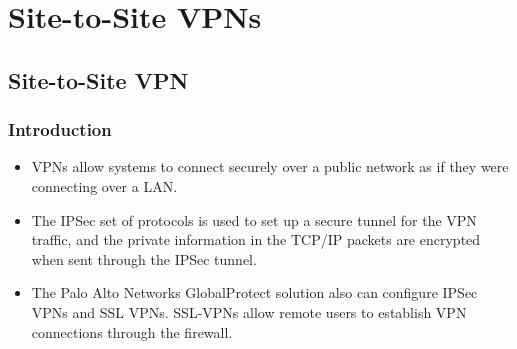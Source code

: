 \section{Site-to-Site VPNs}
\subsection{Site-to-Site VPN}
\subsubsection{Introduction}
\begin{itemize}
    \item VPNs allow systems to connect securely over a public network as if they were connecting over a LAN.
    \item The IPSec set of protocols is used to set up a secure tunnel for the VPN traffic, and the private information in the TCP/IP packets are encrypted when sent through the IPSec tunnel.
    \item The Palo Alto Networks GlobalProtect solution also can configure IPSec VPNs and SSL VPNs. SSL-VPNs allow remote users to establish VPN connections through the firewall.
\end{itemize}

